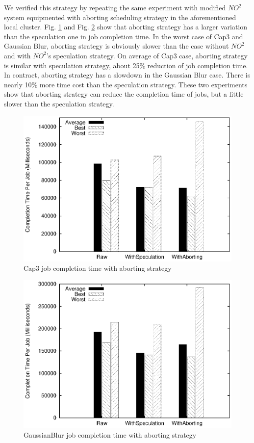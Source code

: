 We verified this strategy by repeating the same experiment with modified $NO^2$ system equipmented with aborting scheduling strategy in the aforementioned local cluster. Fig. \ref{figure:abort_completiontime_cap3} and Fig. \ref{figure:abort_completiontime_gaussianblur} show that aborting strategy has a larger variation than the speculation one in job completion time. In the worst case of Cap3 and Gaussian Blur, aborting strategy is obviously slower than the case without $NO^2$ and with $NO^2$'s speculation strategy. On average of Cap3 case, aborting strategy is similar with speculation strategy, about 25\% reduction of job completion time. In contract, aborting strategy has a slowdown in the Gaussian Blur case. There is nearly 10\% more time cost than the speculation strategy. These two experiments show that aborting strategy can reduce the completion time of jobs, but a little slower than the speculation strategy.

\begin{figure}
\centering
\includegraphics[width=0.9\columnwidth]{figures/abort_completiontime_cap3.eps}
\caption{Cap3 job completion time with aborting strategy}
\label{figure:abort_completiontime_cap3}
\end{figure}

\begin{figure}
\centering
\includegraphics[width=0.9\columnwidth]{figures/abort_completiontime_gaussianblur.eps}
\caption{GaussianBlur job completion time with aborting strategy}
\label{figure:abort_completiontime_gaussianblur}
\end{figure}

